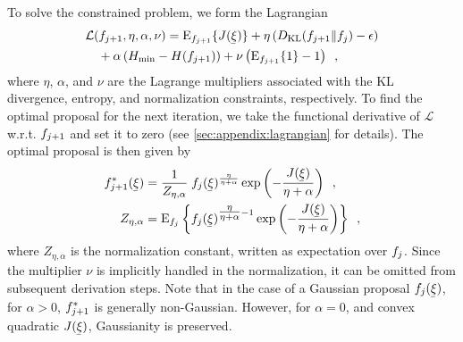 To solve the constrained problem, we form the Lagrangian 
\begin{align}
    & \mathcal{L}(\pdf_{j+1},\eta,\alpha, \nu) = \Eop_{\pdf_{j+1}}\{J(\vVarCem)\}
    + \eta\left(D_{\mathrm{KL}}(\pdf_{j+1} \| \pdf_j) - \epsilon\right) 
    \\ & \quad
    \label{eq:tr:lagrangian}
    + \alpha\left(H_{\min} - H(\pdf_{j+1})\right) 
    + \nu \left( \Eop_{\pdf_{j+1}} \{ 1\} - 1 \right)
    \enspace,
\end{align}
where $\eta$, $\alpha$, and $\nu$ are the Lagrange multipliers associated with the \ac{KL} divergence, entropy, and normalization constraints, respectively.
To find the optimal proposal for the next iteration, we take the functional derivative of $\mathcal{L}$ w.r.t. $f_{j+1}$ and set it to zero (see \cref{sec:appendix:lagrangian} for details).
The optimal proposal is then given by
\begin{align}
    \label{eq:opt_proposal}
    \pdf_{j+1}^{\ast}(\vVarCem) &= \frac{1}{Z_{\eta,\alpha}}\; \pdf_j(\vVarCem)^{\frac{\eta}{\eta+\alpha}}\exp\left(-\frac{J(\vVarCem)}{\eta+\alpha}\right)
    \enspace,
    \\
    \label{eq:opt_proposal:normalization}
    Z_{\eta,\alpha} 
    &= \Eop_{\pdf_j}\left\{ \pdf_j(\vVarCem)^{\tfrac{\eta}{\eta+\alpha}-1}\exp \left( -\frac{J(\vVarCem)}{\eta+\alpha} \right) \right\} \enspace,
\end{align}
where $Z_{\eta,\alpha}$ is the normalization constant, written as expectation over $f_j$.
Since the multiplier $\nu$ is implicitly handled in the normalization, it can be omitted from subsequent derivation steps.
Note that in the case of a Gaussian proposal $\pdf_j(\vVarCem)$, for $\alpha>0$, $f_{j+1}^{\ast}$ is generally non-Gaussian.
However, for $\alpha=0$, and convex quadratic $J(\vVarCem)$, Gaussianity is preserved.

